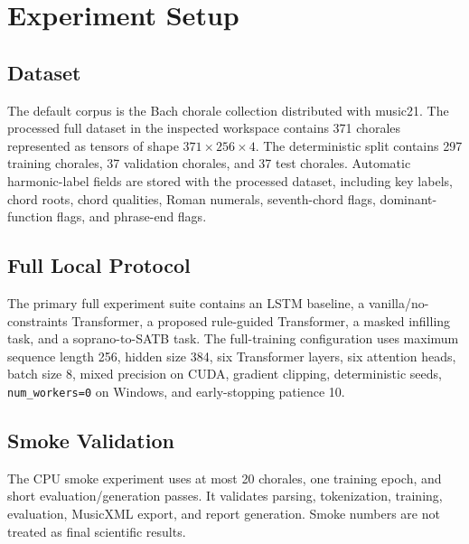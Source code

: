 \section{Experiment Setup}

\subsection{Dataset}

The default corpus is the Bach chorale collection distributed with music21. The processed full dataset in the inspected workspace contains 371 chorales represented as tensors of shape \(371 \times 256 \times 4\). The deterministic split contains 297 training chorales, 37 validation chorales, and 37 test chorales. Automatic harmonic-label fields are stored with the processed dataset, including key labels, chord roots, chord qualities, Roman numerals, seventh-chord flags, dominant-function flags, and phrase-end flags.

\subsection{Full Local Protocol}

The primary full experiment suite contains an LSTM baseline, a vanilla/no-constraints Transformer, a proposed rule-guided Transformer, a masked infilling task, and a soprano-to-SATB task. The full-training configuration uses maximum sequence length 256, hidden size 384, six Transformer layers, six attention heads, batch size 8, mixed precision on CUDA, gradient clipping, deterministic seeds, \texttt{num\_workers=0} on Windows, and early-stopping patience 10.

\subsection{Smoke Validation}

The CPU smoke experiment uses at most 20 chorales, one training epoch, and short evaluation/generation passes. It validates parsing, tokenization, training, evaluation, MusicXML export, and report generation. Smoke numbers are not treated as final scientific results.
